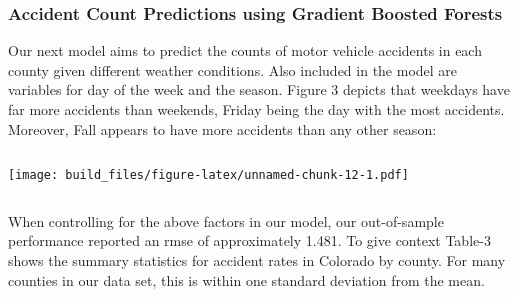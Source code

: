 \documentclass[
]{article}
\begin{document}
\hypertarget{accident-count-predictions-using-gradient-boosted-forests}{%
\subsubsection{Accident Count Predictions using Gradient Boosted
Forests}\label{accident-count-predictions-using-gradient-boosted-forests}}

Our next model aims to predict the counts of motor vehicle accidents in
each county given different weather conditions. Also included in the
model are variables for day of the week and the season. Figure 3 depicts
that weekdays have far more accidents than weekends, Friday being the
day with the most accidents. Moreover, Fall appears to have more
accidents than any other season:

\begin{verbatim}
\end{verbatim}

\texttt{[image: build\_files/figure-latex/unnamed-chunk-12-1.pdf]}

\begin{verbatim}
\end{verbatim}

When controlling for the above factors in our model, our out-of-sample
performance reported an rmse of approximately 1.481. To give context
Table-3 shows the summary statistics for accident rates in Colorado by
county. For many counties in our data set, this is within one standard
deviation from the mean.
\end{document}
